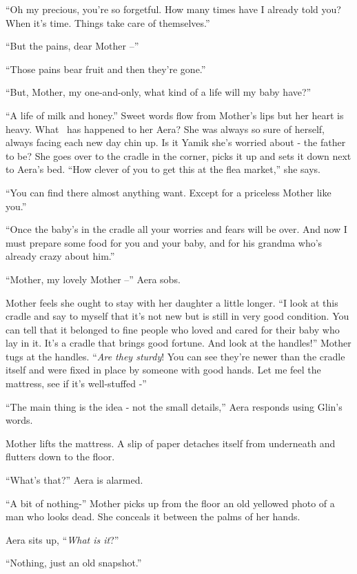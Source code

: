 \documentclass[twoside,11pt]{book}
\begin{document}
``Oh my precious, you're so forgetful. How many times have I already told you? When it's time. Things take
care of themselves.''

``But the pains, dear Mother --''

``Those pains bear fruit and then they're gone.''

``But, Mother, my one-and-only, what kind of a life will my baby have?''

``A life of milk and honey.'' Sweet words flow from Mother's lips but her heart is heavy. What
\ has happened to her Aera? She was always so sure of herself, always facing each new day chin up. Is it Yamik she's
worried about - the father to be? She goes over to the cradle in the corner, picks it up and sets it down next to
Aera's bed. ``How clever of you to get this at the flea market,'' she says.

``You can find there almost anything want. Except for a priceless Mother like you.''

``Once the baby's in the cradle all your worries and fears will be over. And now I must prepare some food
for you and your baby, and for his grandma who's already crazy about him.''

``Mother, my lovely Mother --'' Aera sobs.

Mother feels she ought to stay with her daughter a little longer. ``I look at this cradle and say to myself
that it's not new but is still in very good condition. You can tell that it belonged to fine people
who loved and cared for their baby who lay in it. It's a cradle that brings good fortune. And look at the
handles!'' Mother tugs at the handles. ``\textit{Are they sturdy}! You can see they're newer
than the cradle itself and were fixed in place by someone with good hands. Let me feel the mattress, see if it's
well-stuffed -''

``The main thing is the idea - not the small details,'' Aera responds using Glin's words.

Mother lifts the mattress. A slip of paper detaches itself from underneath and flutters down to the
floor.

``What's that?'' Aera is alarmed.

``A bit of nothing-'' Mother picks up from the floor an old yellowed photo of a man who looks
dead. She conceals it between the palms of her hands.

Aera sits up, ``\textit{What is it}?''

``Nothing, just an old snapshot.''
\end{document}
